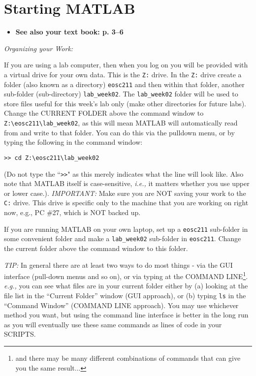 \documentclass[letterpaper]{article}
\begin{document}
\section{Starting MATLAB}

\begin{itemize}
\item {\bf See also your text book: p. 3--6} 
\end{itemize}

{\it Organizing your Work:} 

If you are using a lab computer, then when you log on you will be provided with a virtual
drive for your own data. This is the \verb+Z:+ drive. In the \verb+Z:+  drive create a folder (also known as a directory) \verb+eosc211+ and then within that folder, another
sub-folder (sub-directory) \verb+lab_week02+.  
The \verb+lab_week02+ folder will
be used to store files useful for this week's lab only (make other directories for 
future labs).
Change the CURRENT FOLDER above the command window
to \verb+Z:\eosc211\lab_week02+, as this will mean MATLAB will automatically read
from and write to that folder. You can do this via the pulldown menu, or
by typing the following in the command window:
\begin{verbatim}
>> cd Z:\eosc211\lab_week02
\end{verbatim}
 (Do not type the ``\verb+>>+" as this merely
indicates what the line will look like.  Also note that MATLAB itself is case-sensitive, {\it i.e.,} it matters 
whether you use upper or lower case.).  
{\it IMPORTANT:}  Make sure you are NOT saving your work to the \verb+C:+ drive.
This drive is specific only to the machine that you are working on right now, e.g., PC \#27,
which is NOT backed up.  

If you are running MATLAB on your own laptop, set up a \verb+eosc211+ sub-folder in some convenient folder and make a \verb+lab_week02+ sub-folder in \verb+eosc211+.  Change the current folder above the command window to this folder.

{\it TIP:}  In general there are at least two ways to do most things - via
the GUI interface (pull-down menus and so on), or via typing at the
COMMAND LINE\footnote{and there may be many different combinations of commands that
can give you the same result...}.  {\it e.g.,} you can see what files are in your current folder either by 
(a) looking at the file list in the ``Current Folder'' window (GUI approach), or (b) typing \verb+ls+ in the 
``Command Window'' (COMMAND LINE approach).   
You may use whichever method you want, but using the command
line interface is better in the long run as you will eventually
use these same commands as lines of code in your SCRIPTS.
\end{document}
